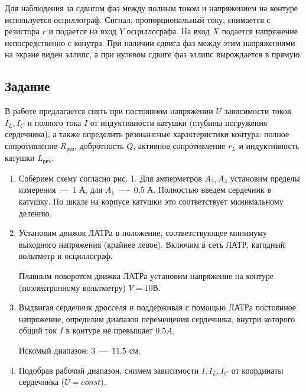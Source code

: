 \documentclass[a4paper, 12pt]{article}
\newcommand{\mysec}[1]{\begin{center}\section*{#1}\end{center}}
\begin{document}
Для наблюдения за сдвигом фаз между полным током и напряжением на контуре используется осциллограф. Сигнал, пропорциональный току, снимается с резистора $r$ и подается на вход $Y$ осциллографа. На вход $X$ подается напряжение непосредственно с конутра. При наличии сдвига фаз между этим напряжениями на экране виден эллипс, а при нулевом сдвиге фаз эллипс вырождается в прямую.

\mysec{Задание}

В работе предлагается снять при постоянном напряжении $U$ зависимости токов $I_L, I_C$ и полного тока $I$ от индуктивности катушки (глубины погружения сердечника), а также определить резонансные характеристики контура: полное сопротивление $R_{рез}$, добротность $Q$, активное сопротивление $r_L$ и индуктивность катушки $L_{рез}$.
\\
\begin{enumerate}
    \item Соберием схему согласно рис. 1. Для амперметров $A_2, A_3$ установим пределы измерения~---~$1$ А, для $A_1$~----~$0.5$ А. Полностью введем сердечник в катушку. По шкале на корпусе катушки это соответствует минимальному делению.
    
    \item Установим движок ЛАТРа в положение, соответствующее минимуму выходного напряжения (крайнее левое). Включим в сеть ЛАТР, катодный вольтметр и осциллограф.
    
    Плавным поворотом движка ЛАТРа установим напряжение на контуре (поэлектронному вольтметру) $V = 10 В$.

    \item Выдвигая сердечник дросселя и поддерживая с помощью ЛАТРа постоянное напряжение, определим диапазон перемещения сердечника, внутри которого общий ток $I$ в контуре не превышает $0.5 A$.
    
    Искомый диапазон: $3$~---~$11.5$ см. 

    \item Подобрав рабочий диапазон, снимем зависимости $I, I_L, I_C$ от координаты сердечника ($U = const$).
    

\end{enumerate}
\end{document}
